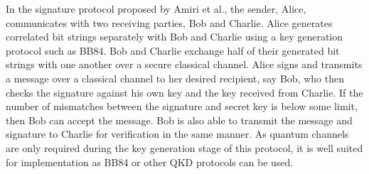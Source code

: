 \documentclass[sigconf]{acmart}
\begin{document}
In the signature protocol proposed by Amiri et al.\cite{amiri_secure_2016}, the sender, Alice, communicates with two receiving parties, Bob and Charlie. Alice generates correlated bit strings separately with Bob and Charlie using a key generation protocol such as BB84. Bob and Charlie exchange half of their generated bit strings with one another over a secure classical channel. Alice signs and transmits a message over a classical channel to her desired recipient, say Bob, who then checks the signature against his own key and the key received from Charlie. If the number of mismatches between the signature and secret key is below some limit, then Bob can accept the message. Bob is also able to transmit the message and signature to Charlie for verification in the same manner. As quantum channels are only required during the key generation stage of this protocol, it is well suited for implementation as BB84 or other QKD protocols can be used.

\end{document}
